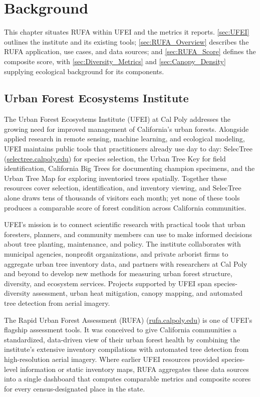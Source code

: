 \chapter{Background} \label{sec:Background}

This chapter situates RUFA within UFEI and the metrics it reports. \autoref{sec:UFEI} outlines the institute and its existing tools; \autoref{sec:RUFA_Overview} describes the RUFA application, use cases, and data sources; and \autoref{sec:RUFA_Score} defines the composite score, with \autoref{sec:Diversity_Metrics} and \autoref{sec:Canopy_Density} supplying ecological background for its components.

\section{Urban Forest Ecosystems Institute} \label{sec:UFEI}

The Urban Forest Ecosystems Institute (UFEI) at Cal Poly addresses the growing need for improved management of California's urban forests. Alongside applied research in remote sensing, machine learning, and ecological modeling, UFEI maintains public tools that practitioners already use day to day: SelecTree (\href{https://selectree.calpoly.edu}{selectree.calpoly.edu}) for species selection, the Urban Tree Key for field identification, California Big Trees for documenting champion specimens, and the Urban Tree Map for exploring inventoried trees spatially. Together these resources cover selection, identification, and inventory viewing, and SelecTree alone draws tens of thousands of visitors each month; yet none of these tools produces a comparable score of forest condition across California communities.

UFEI's mission is to connect scientific research with practical tools that urban foresters, planners, and community members can use to make informed decisions about tree planting, maintenance, and policy. The institute collaborates with municipal agencies, nonprofit organizations, and private arborist firms to aggregate urban tree inventory data, and partners with researchers at Cal Poly and beyond to develop new methods for measuring urban forest structure, diversity, and ecosystem services. Projects supported by UFEI span species-diversity assessment, urban heat mitigation, canopy mapping, and automated tree detection from aerial imagery.

The Rapid Urban Forest Assessment (RUFA) (\href{https://rufa.calpoly.edu}{rufa.calpoly.edu}) is one of UFEI's flagship assessment tools. It was conceived to give California communities a standardized, data-driven view of their urban forest health by combining the institute's extensive inventory compilations with automated tree detection from high-resolution aerial imagery. Where earlier UFEI resources provided species-level information or static inventory maps, RUFA aggregates these data sources into a single dashboard that computes comparable metrics and composite scores for every census-designated place in the state.

